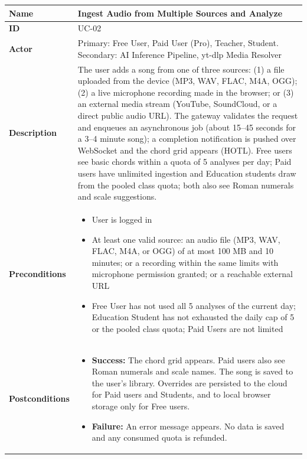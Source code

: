 \documentclass[a4paper]{article}
\newlength{\ucLeft}
\begin{document}
\begin{longtable}{|>{\bfseries}p{\ucLeft}|p{\dimexpr\linewidth-\ucLeft-2\tabcolsep-2\arrayrulewidth}|}
\hline
Name & Ingest Audio from Multiple Sources and Analyze \\ \hline
ID & UC-02 \\ \hline
Actor & Primary: Free User, Paid User (Pro), Teacher, Student. Secondary: AI Inference Pipeline, yt-dlp Media Resolver \\ \hline
Description & The user adds a song from one of three sources: (1) a file uploaded from the device (MP3, WAV, FLAC, M4A, OGG); (2) a live microphone recording made in the browser; or (3) an external media stream (YouTube, SoundCloud, or a direct public audio URL). The gateway validates the request and enqueues an asynchronous job (about 15--45 seconds for a 3--4 minute song); a completion notification is pushed over WebSocket and the chord grid appears (HOTL). Free users see basic chords within a quota of 5 analyses per day; Paid users have unlimited ingestion and Education students draw from the pooled class quota; both also see Roman numerals and scale suggestions. \\ \hline
Preconditions &
\begin{itemize}[leftmargin=1em, nosep, topsep=2pt, partopsep=0pt, parsep=0pt, after=\strut]
    \item User is logged in
    \item At least one valid source: an audio file (MP3, WAV, FLAC, M4A, or OGG) of at most 100 MB and 10 minutes; or a recording within the same limits with microphone permission granted; or a reachable external URL
    \item Free User has not used all 5 analyses of the current day; Education Student has not exhausted the daily cap of 5 or the pooled class quota; Paid Users are not limited
\end{itemize}
\\ \hline
Postconditions &
\begin{itemize}[leftmargin=1em, nosep, topsep=2pt, partopsep=0pt, parsep=0pt, after=\strut]
    \item \textbf{Success:} The chord grid appears. Paid users also see Roman numerals and scale names. The song is saved to the user's library. Overrides are persisted to the cloud for Paid users and Students, and to local browser storage only for Free users.
    \item \textbf{Failure:} An error message appears. No data is saved and any consumed quota is refunded.

\end{itemize}
\end{longtable}
\end{document}
